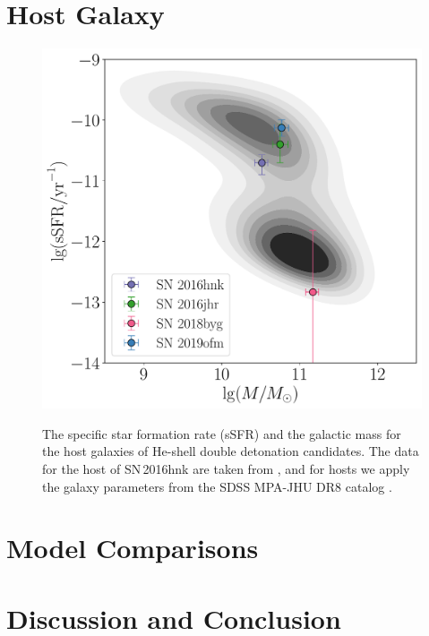 \documentclass[twocolumn]{aastex631}
\begin{document}
\section{Host Galaxy} \label{sec:host}
\begin{figure}
    \centering
    \includegraphics[width=\linewidth]{host.pdf}
    \label{fig:host}
    \caption{The specific star formation rate (sSFR) and the galactic mass for the host galaxies of He-shell double detonation candidates. The data for the host of SN\,2016hnk are taken from \citet{galbany_16hnk_2019}, and for hosts we apply the galaxy parameters from the SDSS MPA-JHU DR8 catalog \citep{Kauffmann_SDSS_2003,Brinchmann_SDSS_2004}.}
\end{figure}

\section{Model Comparisons} \label{sec:model}

\section{Discussion and Conclusion} \label{sec:discussion}

{}



\end{document}
